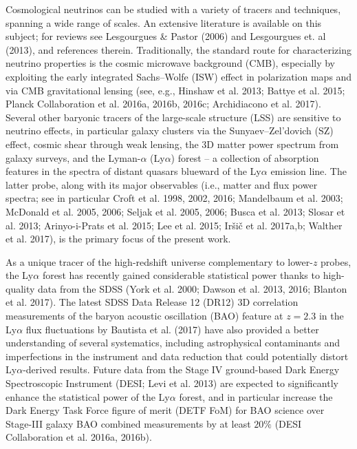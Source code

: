 \documentclass{emulateapj}
\begin{document}
Cosmological neutrinos can be studied with a variety of tracers and techniques, spanning
a wide range of scales. An extensive literature is available on this subject; for reviews see Lesgourgues \& Pastor (2006) and Lesgourgues et. al (2013), and 
references therein. Traditionally, the  standard route for characterizing neutrino properties is the cosmic microwave background (CMB), especially 
by exploiting the early integrated Sachs--Wolfe (ISW) effect in polarization maps and via CMB gravitational lensing (see, e.g., Hinshaw et al. 2013; Battye et al. 2015; Planck Collaboration et al. 2016a, 2016b, 2016c;  Archidiacono et al. 2017). 
Several other baryonic tracers of the large-scale structure (LSS) are sensitive to neutrino effects, in particular
galaxy clusters via the Sunyaev--Zel'dovich (SZ) effect, cosmic shear through weak lensing, the 3D matter power spectrum from galaxy surveys, 
and the Lyman-$\alpha$ (Ly$\alpha$) forest -- a collection of absorption features in the spectra of distant quasars blueward of the Ly$\alpha$ emission line.
The latter probe, along with its major observables (i.e., matter and flux power spectra; see in particular Croft et al. 1998, 2002, 2016; Mandelbaum et al. 2003; McDonald et al. 2005, 2006;  
Seljak et al. 2005, 2006; Busca et al. 2013; Slosar et al. 2013; Arinyo-i-Prats et al. 2015; Lee et al. 2015; Ir{\v s}i{\v c} et al. 2017a,b; Walther et al. 2017), 
 is the primary focus of the present work.
 
As a unique  
tracer of the high-redshift universe complementary to lower-$z$ probes,   
the Ly$\alpha$ forest has recently gained considerable
statistical power thanks to high-quality data from the SDSS (York et al. 2000; Dawson et al. 2013, 2016; Blanton et al. 2017).  
The latest SDSS Data Release 12 (DR12) 3D correlation
measurements of the baryon acoustic oscillation (BAO) feature at $z=2.3$ in the Ly$\alpha$ flux fluctuations
by Bautista et al. (2017) have also  
provided a better understanding of several systematics, including astrophysical contaminants and imperfections in the instrument and data reduction
that could potentially distort Ly$\alpha$-derived results.  
Future data from the Stage IV ground-based 
Dark Energy Spectroscopic Instrument (DESI; Levi et al. 2013) are expected to significantly enhance the statistical
power of the Ly$\alpha$ forest, and in particular  increase the Dark Energy Task Force figure of merit (DETF FoM) for BAO science over Stage-III 
galaxy BAO combined measurements by at least  $20\%$  (DESI Collaboration et al. 2016a, 2016b). 
\end{document}
